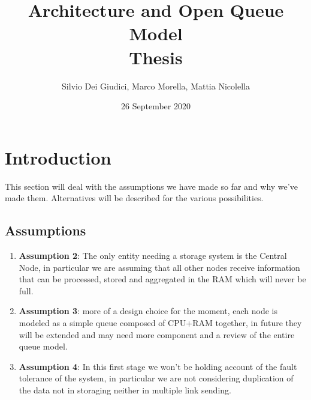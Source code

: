 \documentclass[11pt]{article}
\title {Architecture and Open Queue Model \\ \bigskip \large Thesis}
\author {Silvio Dei Giudici, Marco Morella, Mattia Nicolella}
\date{26 September 2020}
\begin{document}
\maketitle
\section{Introduction}
This section will deal with the assumptions we have made so far and why we've made them. Alternatives will be described for the various possibilities.\\
\subsection{Assumptions}
\begin{enumerate}
\item \textbf{Assumption 2}: The only entity needing a storage system is the Central Node, in particular we are assuming that all other nodes receive information that can be processed, stored and aggregated in the RAM which will never be full. 
\item \textbf{Assumption 3}: more of a design choice for the moment, each node is modeled as a simple queue composed of CPU+RAM together, in future they will be extended and may need more component and a review of the entire queue model.
\item \textbf{Assumption 4}: In this first stage we won't be holding account of the fault tolerance of the system, in particular we are not considering duplication of the data not in storaging neither in multiple link sending.
\end{enumerate}
\end{document}
